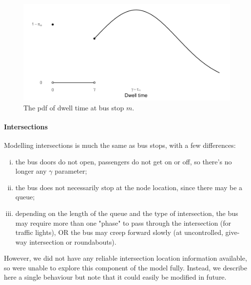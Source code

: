 \begin{knitrout}\small
{}\color{fgcolor}\begin{figure}

{\centering \includegraphics[width=.8\textwidth]{figure/eta_dwell_times-1} 

}

\caption[The \gls{pdf} of dwell time at bus stop $m$]{The \gls{pdf} of dwell time at bus stop $m$.}\label{fig:eta_dwell_times}
\end{figure}


\end{knitrout}



\paragraph{Intersections}

Modelling intersections is much the same as bus stops, with a few differences:
\begin{enumerate}[i.]
\item the bus doors do not open, passengers do not get on or off, so there's no longer any $\gamma$ parameter;
\item the bus does not necessarily stop at the node location, since there may be a queue;
\item depending on the length of the queue and the type of intersection, the bus may require more than one "phase" to pass through the intersection (for traffic lights), OR the bus may creep forward slowly (at uncontrolled, give-way intersection or roundabouts).
\end{enumerate}

However, we did not have any reliable intersection location information available, so were unable to explore this component of the model fully. Instead, we describe here a single behaviour but note that it could easily be modified in future.

